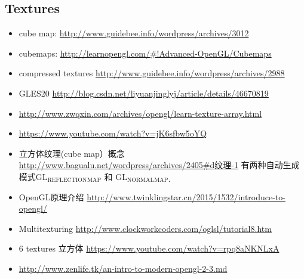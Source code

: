 \documentclass[9pt,b5paper]{article}
\begin{document}
\subsection{Textures}
\label{sec-2-2}
\begin{itemize}
\item cube map: \url{http://www.guidebee.info/wordpress/archives/3012}
\item cubemaps: \url{http://learnopengl.com/#!Advanced-OpenGL/Cubemaps}
\item compressed textures \url{http://www.guidebee.info/wordpress/archives/2988}
\item GLES20 \url{http://blog.csdn.net/liyuanjinglyj/article/details/46670819}
\item \url{http://www.zwqxin.com/archives/opengl/learn-texture-array.html}
\item \url{https://www.youtube.com/watch?v=jK6sfbw5oYQ}
\item 立方体纹理(cube map）概念 \url{http://www.bagualu.net/wordpress/archives/2405#d纹理-1} 
  有两种自动生成模式GL$_{\text{REFLECTION}}$$_{\text{MAP}}$ 和 GL$_{\text{NORMAL}}$$_{\text{MAP．}}$
\item OpenGL原理介绍 \url{http://www.twinklingstar.cn/2015/1532/introduce-to-opengl/}
\item Multitexturing \url{http://www.clockworkcoders.com/oglsl/tutorial8.htm}
\item 6 textures 立方体 \url{https://www.youtube.com/watch?v=rpq8aNKNLxA}
\item \url{http://www.zenlife.tk/an-intro-to-modern-opengl-2-3.md}
\end{itemize}
\end{document}
